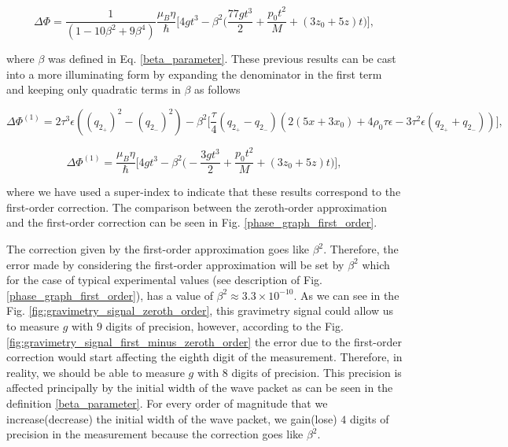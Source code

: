 \documentclass{article}
\begin{document}
\begin{equation}
\Delta \Phi = \frac{1}{\left(1 -10 \beta ^2 + 9 \beta ^4\right)} \frac{\mu_{B} \eta}{\hbar}
\Bigg[ 4 g t^3
- \beta ^2 \bigg(\frac{77 g t^3}{2} + \frac{p_{0}t^2}{M}  + (3z_{0}+5z)t \bigg) \Bigg],
\end{equation}

where $\beta$ was defined in Eq. \ref{beta_parameter}.
These previous results can be cast into a more illuminating form by expanding the denominator in the first term  and keeping only quadratic terms in $\beta$ as follows

\begin{equation}\label{gravimetry_signal_first_order_approx}
\Delta \Phi ^{(1)} = 
 2 \tau ^3 \epsilon \text{} \left( \text{$(q_{2_{+}})$}^2- \text{$(q_{2_{-}})$}^2\right)
- \beta ^2 \bigg[ \frac{\tau }{4} (\text{$q_{2_{+}}$}-\text{$q_{2_{-}}$}) \left(2 \left(5 x+3 x_0\right) +4 \rho _0 \tau  \epsilon - 3\tau ^2 \epsilon  \text{} (\text{$q_{2_{+}}$}+\text{$q_{2_{-}}$}) \right) \bigg],
\end{equation}

\begin{equation}\label{gravimetry_signal_first_order_approx_dimensional}
\Delta \Phi ^{(1)} =  \frac{\mu_{B} \eta}{\hbar}
\Bigg[ 4 g t^3
- \beta ^2 \bigg(-\frac{3 g t^3}{2} + \frac{p_{0}t^2}{M}  + (3z_{0}+5z)t \bigg) \Bigg],
\end{equation}

where we have used a super-index to indicate that these results correspond to the first-order correction.
The comparison between the zeroth-order approximation and the first-order correction can be seen in Fig. \ref{phase_graph_first_order}.

The correction given by the first-order approximation goes like $\beta ^2$. Therefore, the error made by considering the first-order approximation will be set by $\beta ^2$ which for the case of typical experimental values (see description of Fig. \ref{phase_graph_first_order}), has a value of $\beta ^2 \approx 3.3 \times 10^{-10}$. As we can see in the Fig. \ref{fig:gravimetry_signal_zeroth_order}, this gravimetry signal could allow us to measure $g$ with $9$ digits of precision, however, according to the Fig. \ref{fig:gravimetry_signal_first_minus_zeroth_order} the error due to the first-order correction would start affecting the eighth digit of the measurement. Therefore, in reality, we should be able to measure $g$ with $8$ digits of precision. This precision is affected principally by the initial width of the wave packet as can be seen in the definition \ref{beta_parameter}. For every order of magnitude that we increase(decrease) the initial width of the wave packet, we gain(lose) $4$ digits of precision in the measurement because the correction goes like $\beta ^2$.
\end{document}
